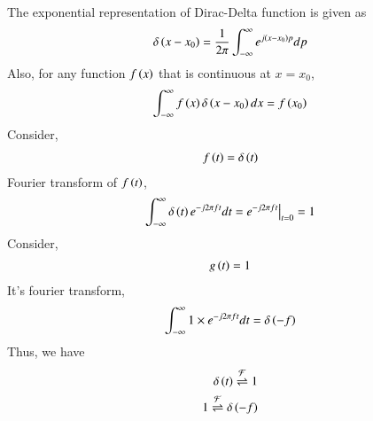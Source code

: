 \documentclass[journal,12pt,twocolumn]{IEEEtran}
\begin{document}
The exponential representation of Dirac-Delta function is given as
\begin{align}
    \delta\left(x-x_0\right) = \frac{1}{2\pi} \int_{-\infty}^{\infty} e^{j\left(x-x_0\right)p} dp
\end{align}
Also, for any function $f\left(x\right)$ that is continuous at $x = x_0$,
\begin{align}
    \int_{-\infty}^{\infty} f\left(x\right)\delta\left(x-x_0\right) dx = f\left(x_0\right)
\end{align}
Consider,
\begin{align}
    f\left(t\right) = \delta\left(t\right)
\end{align}
Fourier transform of $f\left(t\right)$,
\begin{align}
    \int_{-\infty}^{\infty} \delta\left(t\right) e^{-j2\pi ft} dt = e^{-j2\pi f t}\big{|}_{t = 0} = 1
\end{align}
Consider,
\begin{align}
    g\left(t\right) = 1
\end{align}
It's fourier transform,
\begin{align}
    \int_{-\infty}^{\infty}1\times e^{-j2 \pi f t} dt = \delta\left(-f\right)
\end{align}
Thus, we have
\begin{align}
    \delta\left(t\right) \overset{\mathcal{F}}{ \rightleftharpoons} 1\\
    1 \overset{\mathcal{F}}{ \rightleftharpoons}{\delta} \left(-f\right)
\end{align}
\end{document}
